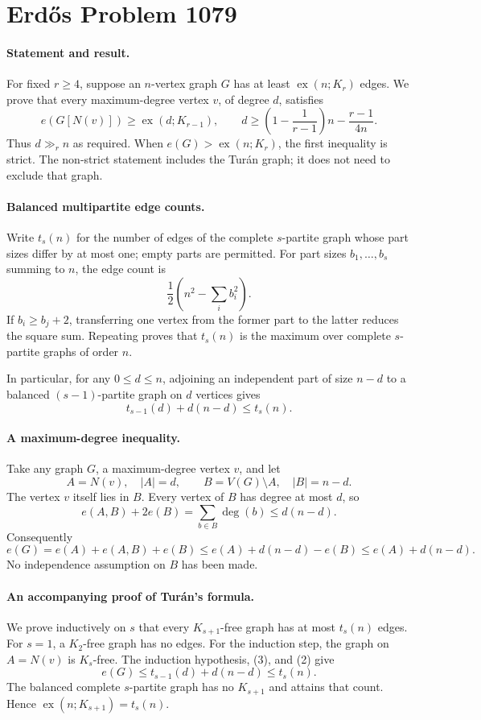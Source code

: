 \section*{Erd\H{o}s Problem 1079}

\paragraph{Statement and result.}
For fixed \(r\geq4\), suppose an \(n\)-vertex graph \(G\) has at least \(\operatorname{ex}(n;K_r)\) edges. We prove that every maximum-degree vertex \(v\), of degree \(d\), satisfies
\[
 e(G[N(v)])\geq\operatorname{ex}(d;K_{r-1}),
 \qquad d\geq\left(1-\frac1{r-1}\right)n-\frac{r-1}{4n}.
 \tag{1}
\]
Thus \(d\gg_r n\) as required. When \(e(G)>\operatorname{ex}(n;K_r)\), the first inequality is strict. The non-strict statement includes the Tur\'an graph; it does not need to exclude that graph.

\paragraph{Balanced multipartite edge counts.}
Write \(t_s(n)\) for the number of edges of the complete \(s\)-partite graph whose part sizes differ by at most one; empty parts are permitted. For part sizes \(b_1,\ldots,b_s\) summing to \(n\), the edge count is
\[
 \frac12\left(n^2-\sum_i b_i^2\right).
\]
If \(b_i\geq b_j+2\), transferring one vertex from the former part to the latter reduces the square sum. Repeating proves that \(t_s(n)\) is the maximum over complete \(s\)-partite graphs of order \(n\).

In particular, for any \(0\leq d\leq n\), adjoining an independent part of size \(n-d\) to a balanced \((s-1)\)-partite graph on \(d\) vertices gives
\[
 t_{s-1}(d)+d(n-d)\leq t_s(n). \tag{2}
\]

\paragraph{A maximum-degree inequality.}
Take any graph \(G\), a maximum-degree vertex \(v\), and let
\[
 A=N(v),\quad |A|=d,\qquad B=V(G)\setminus A,\quad |B|=n-d.
\]
The vertex \(v\) itself lies in \(B\). Every vertex of \(B\) has degree at most \(d\), so
\[
 e(A,B)+2e(B)=\sum_{b\in B}\deg(b)\leq d(n-d).
\]
Consequently
\[
 e(G)=e(A)+e(A,B)+e(B)
 \leq e(A)+d(n-d)-e(B)
 \leq e(A)+d(n-d). \tag{3}
\]
No independence assumption on \(B\) has been made.

\paragraph{An accompanying proof of Tur\'an's formula.}
We prove inductively on \(s\) that every \(K_{s+1}\)-free graph has at most \(t_s(n)\) edges. For \(s=1\), a \(K_2\)-free graph has no edges. For the induction step, the graph on \(A=N(v)\) is \(K_s\)-free. The induction hypothesis, (3), and (2) give
\[
 e(G)\leq t_{s-1}(d)+d(n-d)\leq t_s(n).
\]
The balanced complete \(s\)-partite graph has no \(K_{s+1}\) and attains that count. Hence
\(\operatorname{ex}(n;K_{s+1})=t_s(n)\).

